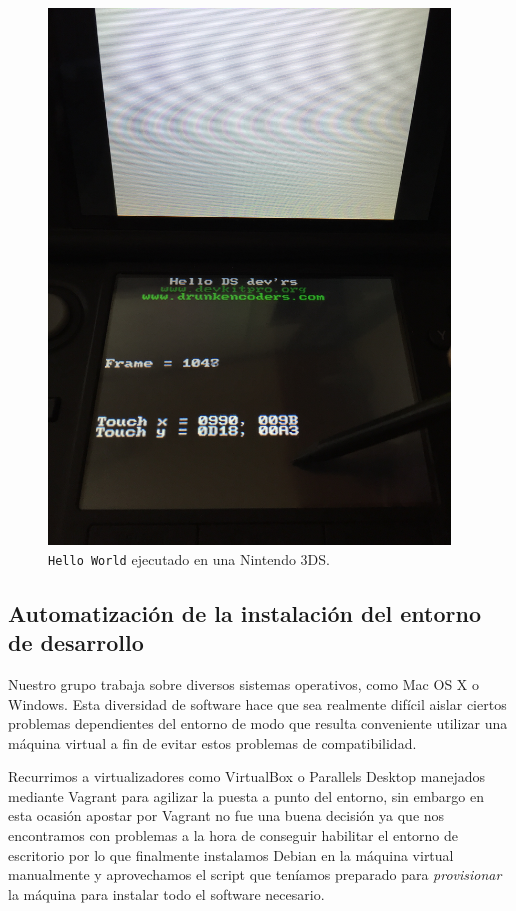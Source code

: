 \begin{figure}[h!]
	\caption{{\tt Hello World} ejecutado en una Nintendo 3DS.}
	\label{fig:dependency}
	\centering
	\includegraphics[width=0.95\textwidth,angle=270]{P1Media/3DS}
\end{figure}
	
	\subsection{Automatización de la instalación del entorno de desarrollo}
	
	Nuestro grupo trabaja sobre diversos sistemas operativos, como Mac OS X o Windows. Esta diversidad de software hace que sea realmente difícil aislar ciertos problemas dependientes del entorno de modo que resulta conveniente utilizar una máquina virtual a fin de evitar estos problemas de compatibilidad.
	
	Recurrimos a virtualizadores como VirtualBox o Parallels Desktop manejados mediante Vagrant para agilizar la puesta a punto del entorno, sin embargo en esta ocasión apostar por Vagrant no fue una buena decisión ya que nos encontramos con problemas a la hora de conseguir habilitar el entorno de escritorio por lo que finalmente instalamos Debian en la máquina virtual manualmente y aprovechamos el script que teníamos preparado para \emph{provisionar} la máquina para instalar todo el software necesario.
	
